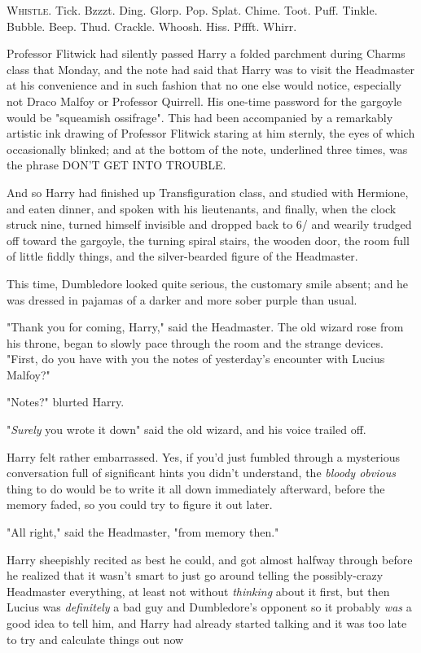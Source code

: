
\lettrine{W}{histle.} Tick.
Bzzzt. Ding. Glorp. Pop. Splat. Chime. Toot. Puff. Tinkle. Bubble. Beep. Thud.
Crackle. Whoosh. Hiss. Pffft. Whirr.

Professor Flitwick had silently passed Harry a folded parchment during Charms
class that Monday, and the note had said that Harry was to visit the Headmaster
at his convenience and in such fashion that no one else would notice,
especially not Draco Malfoy or Professor Quirrell. His one-time password for
the gargoyle would be "squeamish ossifrage". This had been accompanied by a
remarkably artistic ink drawing of Professor Flitwick staring at him sternly,
the eyes of which occasionally blinked; and at the bottom of the note,
underlined three times, was the phrase DON'T GET INTO TROUBLE.

And so Harry had finished up Transfiguration class, and studied with Hermione,
and eaten dinner, and spoken with his lieutenants, and finally, when the clock
struck nine, turned himself invisible and dropped back to 6\PM/ and wearily
trudged off toward the gargoyle, the turning spiral stairs, the wooden door,
the room full of little fiddly things, and the silver-bearded figure of the
Headmaster.

This time, Dumbledore looked quite serious, the customary smile absent; and he
was dressed in pajamas of a darker and more sober purple than usual.

"Thank you for coming, Harry," said the Headmaster. The old wizard rose from
his throne, began to slowly pace through the room and the strange devices.
"First, do you have with you the notes of yesterday's encounter with Lucius
Malfoy?"

"Notes?" blurted Harry.

"\emph{Surely} you wrote it down{\el}" said the old wizard, and his voice
trailed off.

Harry felt rather embarrassed. Yes, if you'd just fumbled through a mysterious
conversation full of significant hints you didn't understand, the \emph{bloody
obvious} thing to do would be to write it all down immediately afterward,
before the memory faded, so you could try to figure it out later.

"All right," said the Headmaster, "from memory then."

Harry sheepishly recited as best he could, and got almost halfway through
before he realized that it wasn't smart to just go around telling the
possibly-crazy Headmaster everything, at least not without \emph{thinking}
about it first, but then Lucius was \emph{definitely} a bad guy and
Dumbledore's opponent so it probably \emph{was} a good idea to tell him, and
Harry had already started talking and it was too late to try and calculate
things out now{\el}


